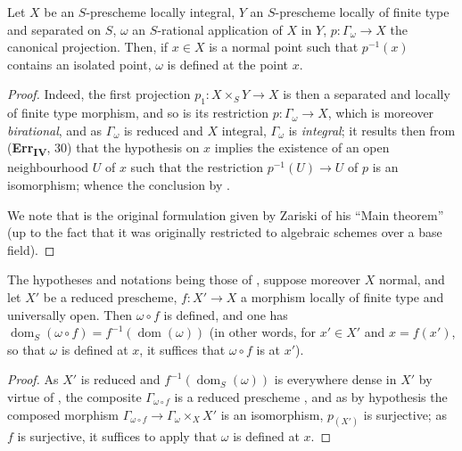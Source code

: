 \begin{proposition}[20.4.4]
\label{IV.20.4.4}
Let $X$ be an $S$-prescheme locally integral, $Y$ an $S$-prescheme locally of finite type and separated on $S$, $\omega$ an $S$-rational application of $X$ in $Y$, $p:\Gamma_\omega\to X$ the canonical projection.
Then, if $x\in X$ is a normal point such that $p^{-1}(x)$ contains an isolated point, $\omega$ is defined at the point $x$.
\end{proposition}

\begin{proof}
Indeed, the first projection $p_1:X\times_S Y\to X$ is then a separated and locally of finite type morphism, and so is its restriction $p:\Gamma_\omega\to X$, which is moreover \emph{birational}, and as $\Gamma_\omega$ is reduced and $X$ integral, $\Gamma_\omega$ is \emph{integral};
it results then from (\textbf{Err}\textsubscript{\textbf{IV}}, 30) that the hypothesis on $x$ implies the existence of an open neighbourhood $U$ of $x$ such that the restriction $p^{-1}(U)\to U$ of $p$ is an isomorphism; whence the conclusion by .

We note that  is the original formulation given by Zariski of his ``Main theorem'' (up to the fact that it was originally restricted to algebraic schemes over a base field).
\end{proof}

\begin{proposition}[20.4.5]
\label{IV.20.4.5}
The hypotheses and notations being those of , suppose moreover $X$ normal, and let $X'$ be a reduced prescheme, $f:X'\to X$ a morphism locally of finite type and universally open.
Then $\omega\circ f$ is defined, and one has $\operatorname{dom}_S(\omega\circ f)=f^{-1}(\operatorname{dom}(\omega))$ (in other words, for $x'\in X'$ and $x=f(x')$, so that $\omega$ is defined at $x$, it suffices that $\omega\circ f$ is at $x'$).
\end{proposition}

\begin{proof}
As $X'$ is reduced and $f^{-1}(\operatorname{dom}_S(\omega))$ is everywhere dense in $X'$ by virtue of , the composite $\Gamma_{\omega\circ f}$ is a reduced prescheme , and as by hypothesis the composed morphism $\Gamma_{\omega\circ f}\to\Gamma_\omega\times_X X'$
is an isomorphism, $p_{(X')}$ is surjective;
as $f$ is surjective, it suffices to apply  that $\omega$ is defined at $x$.
\end{proof}

